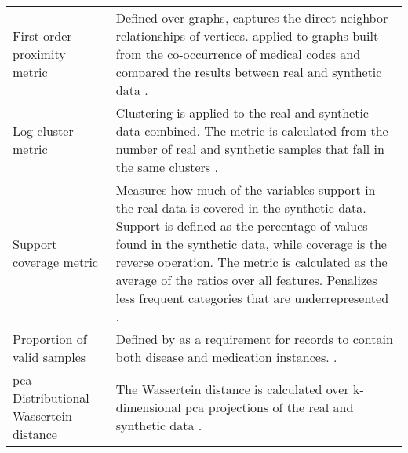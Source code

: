 \begin{table}[]
\begin{tabularx}{\textwidth}{@{} p{} X @{}}
            First-order proximity metric & 
            Defined over graphs, captures the direct neighbor relationships of vertices. \citeauthor{Zhang2020} applied to graphs built from the co-occurrence of medical codes and compared the results between real and synthetic data \cite{Zhang2020}.\\
            
            Log-cluster metric & 
            Clustering is applied to the real and synthetic data combined. The metric is calculated from the number of real and synthetic samples that fall in the same clusters \cite{Goncalves2020}.\\
            
            Support coverage metric & 
            Measures how much of the variables support in the real data is covered in the synthetic data. Support is defined as the percentage of values found in the synthetic data, while coverage is the reverse operation. The metric is calculated as the average of the ratios over all features. Penalizes less frequent categories that are underrepresented \cite{Goncalves2020}.\\
 
            Proportion of valid samples & 
            Defined by \citeauthor{Yang_2019_ehr} as a requirement for records to contain both disease and medication instances. \cite{Yang_2019_ehr}.\\
            
            \gls{pca} Distributional Wassertein distance 
            & The Wassertein distance is calculated over k-dimensional \gls{pca} projections of the real and synthetic data \cite{tanti2019}.\\
            
            \bottomrule
        \end{tabularx}
    \end{table}